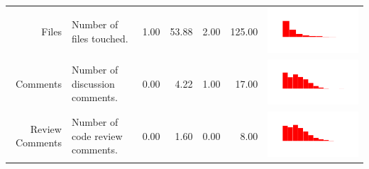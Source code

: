 \documentclass[conference]{IEEEtran}
\begin{document}
\begin{table}[ht]
\begin{tabular}{rp{26em}rrrrc}
    Files & Number of files touched. & 1.00 & 53.88 & 2.00 & 125.00 & \includegraphics[scale = 0.1, clip = true, trim= 50px 60px 50px 60px]{../figs/hist-features/hist-files.pdf} \\
    Comments & Number of discussion comments. & 0.00 & 4.22 & 1.00 & 17.00 & \includegraphics[scale = 0.1, clip = true, trim= 50px 60px 50px 60px]{../figs/hist-features/hist-comments.pdf} \\
    Review Comments & Number of code review comments. & 0.00 & 1.60 & 0.00 & 8.00 & \includegraphics[scale = 0.1, clip = true, trim= 50px 60px 50px 60px]{../figs/hist-features/hist-reviewComments.pdf} \\

\end{tabular}
\end{table}
\end{document}
